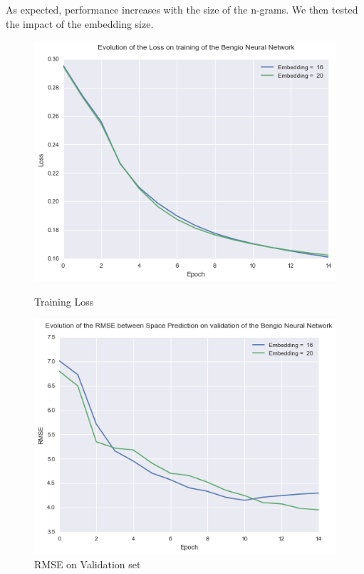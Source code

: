 \documentclass[11pt]{article}
\begin{document}
As expected, performance increases with the size of the n-grams. We then tested the impact of the embedding size. 

\begin{figure}[H]
\centering
\begin{minipage}{.5\textwidth}
  \centering
  \includegraphics[width=1\linewidth]{train_nn_em}
  \caption{Training Loss}
\end{minipage}%
\begin{minipage}{.5\textwidth}
  \centering
  \includegraphics[width=1\linewidth]{rmse_em}
  \caption{RMSE on Validation set}
\end{minipage}
\end{figure}
\end{document}
